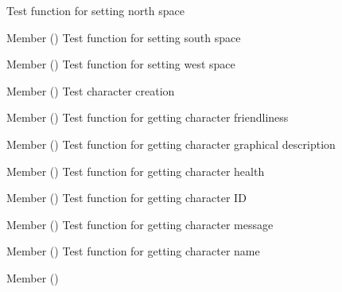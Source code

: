 \begin{DoxyRefList}
%
Test function for setting north space  
\item[Member \doxylink{space__test_8h_a21938e16547b3080e9251f960117a859}{test1\+\_\+space\+\_\+set\+\_\+south} ()]\label{test__test000125}%
%
Test function for setting south space  
\item[Member \doxylink{space__test_8h_ab680a8797f793dffd58546074b87d21f}{test1\+\_\+space\+\_\+set\+\_\+west} ()]\label{test__test000129}%
%
Test function for setting west space  
\item[Member \doxylink{character__test_8h_af34c287530289519f39a8c676ab1f296}{test2\+\_\+character\+\_\+create} ()]\label{test__test000002}%
%
Test character creation  
\item[Member \doxylink{character__test_8h_a86a876aee28d07e4f303bc58c5a64f51}{test2\+\_\+character\+\_\+get\+\_\+friendly} ()]\label{test__test000014}%
%
Test function for getting character friendliness  
\item[Member \doxylink{character__test_8h_a0a36400b7491ab6e9326ce661e61c611}{test2\+\_\+character\+\_\+get\+\_\+gdesc} ()]\label{test__test000008}%
%
Test function for getting character graphical description  
\item[Member \doxylink{character__test_8h_a73548b592b58d36e2c9579512396444c}{test2\+\_\+character\+\_\+get\+\_\+health} ()]\label{test__test000012}%
%
Test function for getting character health  
\item[Member \doxylink{character__test_8h_acc183175913712e7f2b0e98a9b55bc2b}{test2\+\_\+character\+\_\+get\+\_\+id} ()]\label{test__test000004}%
%
Test function for getting character ID  
\item[Member \doxylink{character__test_8h_a085a8c64daee7cb3a5bc38a9017717ba}{test2\+\_\+character\+\_\+get\+\_\+message} ()]\label{test__test000010}%
%
Test function for getting character message  
\item[Member \doxylink{character__test_8h_a01ef678eee58465bbdc52094838a65f7}{test2\+\_\+character\+\_\+get\+\_\+name} ()]\label{test__test000006}%
%
Test function for getting character name  
\item[Member \doxylink{character__test_8h_a0b796a2462560391b16de03607cb52e6}{test2\+\_\+character\+\_\+set\+\_\+friendly} ()]\label{test__test000027}%

\end{DoxyRefList}
